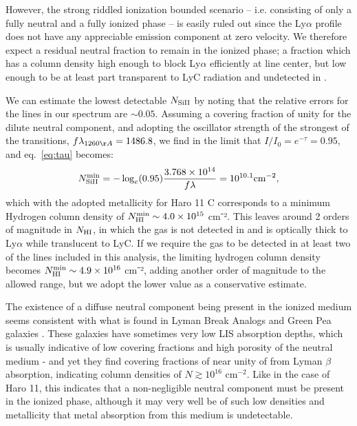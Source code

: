 \documentclass[twocolumn,]{aastex61}
\begin{document}
However, the strong riddled ionization bounded scenario -- i.e.
consisting of only a fully neutral and a fully ionized phase -- is easily ruled
out since the Ly$\alpha$ profile does not have any appreciable emission
component at zero velocity. We therefore expect a residual neutral fraction to
remain in the ionized phase; a fraction which has a column density high enough
to block Ly$\alpha$ efficiently at line center, but low enough to be at least
part transparent to LyC radiation and undetected in .

We can estimate the lowest detectable $N_{\rm Si II}$ by noting that the
relative errors for the  lines in our spectrum are
$\sim 0.05$. Assuming a covering fraction of unity for the dilute
neutral component, and adopting the oscillator strength of the strongest
of the  transitions, $f\lambda_{1260 \AA} = 1486.8$, we find
in the limit that $I/I_0 = e^{-\tau} = 0.95$, and eq.~\ref{eq:tau}
becomes:
%
\begin{equation}
\label{eq:silim}
N_{\rm Si II}^{\rm min} = -\log_{e}(0.95) \frac{3.768 \times 10^{14}}{f\lambda} 
    = 10^{10.1} \text{cm}^{-2},
\end{equation}
%
which with the adopted metallicity for Haro 11 C corresponds to a
minimum Hydrogen column density of
$N_{\rm HI}^{\rm min} \sim 4.0 \times 10^{15}$ cm⁻². This leaves around
2 orders of magnitude in $N_{\rm H I}$, in which the gas is not detected
in  and is optically thick to Ly$\alpha$ while translucent to
LyC. If we require the gas to be detected in at least two of
the lines included in this analysis, the limiting hydrogen column
density becomes $N_{\rm HI}^{\rm min} \sim 4.9 \times 10^{16}$ cm⁻²,
adding another order of magnitude to the allowed range, but we adopt the
lower value as a conservative estimate.

The existence of a diffuse neutral component being present in the ionized medium
seems consistent with what is found in Lyman Break Analogs and Green Pea
galaxies \citep{Heckman2011, Henry2015}.  These galaxies have sometimes very low
LIS absorption depths, which is usually indicative of low covering fractions and
high porosity of the neutral medium - and yet they find covering fractions of
near unity of  from Lyman $\beta$ absorption, indicating column
densities of $N \gtrsim 10^{16}$ cm$^{-2}$. Like in the case of Haro 11, this
indicates that a non-negligible neutral component must be present in the ionized
phase, although it may very well be of such low densities and metallicity that
metal absorption from this medium is undetectable.
\end{document}
